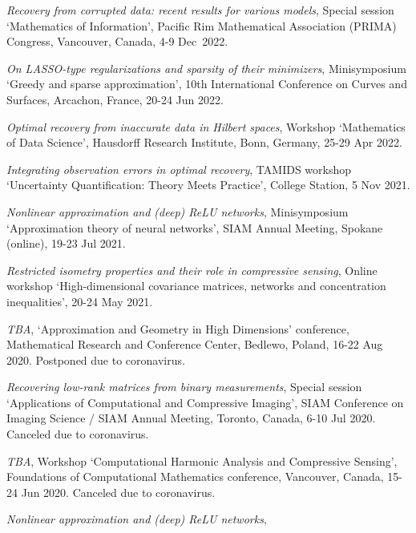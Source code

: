 \documentclass[11pt]{article}
\begin{document}
\item {\sl Recovery from corrupted data: recent results for various models},  Special session `Mathematics of Information',
Pacific Rim Mathematical Association (PRIMA) Congress, 
Vancouver, Canada,  4-9 Dec~2022.
\item {\sl On LASSO-type regularizations and sparsity of their minimizers}, Minisymposium `Greedy and sparse approximation',
10th International Conference on Curves and Surfaces,
Arcachon, France, 20-24 Jun 2022.
\item {\sl Optimal recovery from inaccurate data in Hilbert spaces},
Workshop `Mathematics of Data Science',
Hausdorff Research Institute, Bonn, Germany,  25-29 Apr 2022.
\item {\sl Integrating observation errors in optimal recovery},
TAMIDS workshop `Uncertainty Quantification: Theory Meets Practice',
College Station, 5 Nov 2021.
\item {\sl Nonlinear approximation and (deep) ReLU networks}, Minisymposium `Approximation theory of neural networks',
SIAM Annual Meeting, Spokane (online),
19-23 Jul 2021.
\item {\sl Restricted isometry properties and their role in compressive sensing},
Online workshop `High-dimensional covariance matrices, networks and concentration inequalities', 20-24 May 2021.
\item {\sl TBA},
`Approximation and Geometry in High Dimensions' conference,
Mathematical Research and Conference Center, Bedlewo, Poland,
16-22 Aug 2020.
{\small Postponed due to coronavirus.}
\item {\sl Recovering low-rank matrices from binary measurements}, 
Special session
`Applications of Computational and Compressive Imaging',
SIAM Conference on Imaging Science / SIAM Annual Meeting,
Toronto, Canada, 6-10 Jul 2020.
{\small Canceled due to coronavirus.}
\item {\sl TBA},
Workshop `Computational Harmonic Analysis and Compressive Sensing',
Foundations of Computational Mathematics conference, 
Vancouver, Canada, 15-24 Jun 2020. {\small Canceled due to coronavirus.}
\item {\sl Nonlinear approximation and (deep) ReLU networks},
\end{document}
